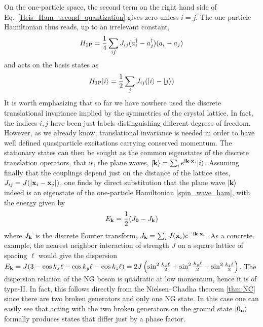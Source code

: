 \documentclass[final,3p,times,12pt,a4paper,sort&compress]{elsarticle}
\newcommand\vek[1]{{\boldsymbol{\bf #1}}}   %
\newcommand\skal[2]{\vek{#1}\cdot\vek{#2}}  %
\newcommand\ket[1]{\vert#1\rangle}          %
\newcommand\he[1]{#1^{\dagger}}             %
\newcommand\imag{\mathrm i}                 %
\newcommand\abs[1]{\left|#1\right|}         %
\begin{document}
On the one-particle space, the second term on the right hand side of
Eq.~\eqref{Heis_Ham_second_quantization} gives zero unless $i=j$. The
one-particle Hamiltonian thus reads, up to an irrelevant constant,
\begin{equation}
H_{1\text P}=\frac14\sum_{ij}J_{ij}(\he a_i-\he a_j)(a_i-a_j)
\end{equation}
and acts on the basis states as
\begin{equation}
H_{1\text P}\ket i=\frac12\sum_jJ_{ij}(\ket i-\ket j)
\label{spin_wave_ham}
\end{equation}
It is worth emphasizing that so far we have nowhere used the discrete
translational invariance implied by the symmetries of the crystal lattice. In
fact, the indices $i,j$ have been just labels distinguishing different degrees
of freedom. However, as we already know, translational invariance is needed in
order to have well defined quasiparticle excitations carrying conserved
momentum. The stationary states can then be sought as the common eigenstates of
the discrete translation operators, that is, the plane waves, $\ket{\vek
k}=\sum_i e^{\imag\skal kx_i}\ket i$. Assuming finally that the couplings
depend just on the distance of the lattice sites, $J_{ij}=J(\abs{\vek x_i-\vek
x_j})$, one finds by direct substitution that the plane wave $\ket{\vek k}$
indeed is an eigenstate of the one-particle Hamiltonian \eqref{spin_wave_ham},
with the energy given by
\begin{equation}
E_{\vek k}=\frac12(J_{\vek0}-J_{\vek k})
\label{E_magnon}
\end{equation}
where $J_{\vek k}$ is the discrete Fourier transform, $J_{\vek k}=\sum_i J(\vek
x_i)e^{-\imag\skal kx_i}$. As a concrete example, the nearest neighbor
interaction of strength $J$ on a square lattice of spacing $\ell$ would give
the dispersion $E_{\vek k}=J(3-\cos k_x\ell-\cos k_y\ell-\cos k_z\ell)=
2J\left(\sin^2\frac{k_x\ell}2+\sin^2\frac{k_y\ell}2+\sin^2\frac{k_z\ell}2\right)$.
The dispersion relation of the NG boson is quadratic at low momentum, hence it
is of type-II. In fact, this follows directly from the Nielsen--Chadha theorem
\ref{thm:NC} since there are two broken generators and only one NG state. In
this case one can easily see that acting with the two broken generators on the
ground state $\ket{0_{\vek n}}$ formally produces states that differ just by a
phase factor.
\end{document}
